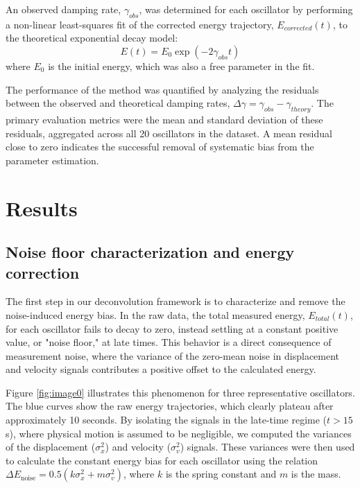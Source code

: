 \documentclass[]{article}
\begin{document}
An observed damping rate, $\gamma_{obs}$, was determined for each oscillator by performing a non-linear least-squares fit of the corrected energy trajectory, $E_{corrected}(t)$, to the theoretical exponential decay model:
\begin{equation}
E(t) = E_0 \exp(-2\gamma_{obs} t)
\end{equation}
where $E_0$ is the initial energy, which was also a free parameter in the fit.

The performance of the method was quantified by analyzing the residuals between the observed and theoretical damping rates, $\Delta\gamma = \gamma_{obs} - \gamma_{theory}$. The primary evaluation metrics were the mean and standard deviation of these residuals, aggregated across all 20 oscillators in the dataset. A mean residual close to zero indicates the successful removal of systematic bias from the parameter estimation.

\section{Results}
\label{sec:results}
\subsection{Noise floor characterization and energy correction}

The first step in our deconvolution framework is to characterize and remove the noise-induced energy bias. In the raw data, the total measured energy, $E_{total}(t)$, for each oscillator fails to decay to zero, instead settling at a constant positive value, or "noise floor," at late times. This behavior is a direct consequence of measurement noise, where the variance of the zero-mean noise in displacement and velocity signals contributes a positive offset to the calculated energy.

Figure \ref{fig:image0} illustrates this phenomenon for three representative oscillators. The blue curves show the raw energy trajectories, which clearly plateau after approximately 10 seconds. By isolating the signals in the late-time regime ($t > 15$ s), where physical motion is assumed to be negligible, we computed the variances of the displacement ($\sigma_x^2$) and velocity ($\sigma_v^2$) signals. These variances were then used to calculate the constant energy bias for each oscillator using the relation $\Delta E_{\text{noise}} = 0.5(k\sigma_x^2 + m\sigma_v^2)$, where $k$ is the spring constant and $m$ is the mass.
\end{document}

